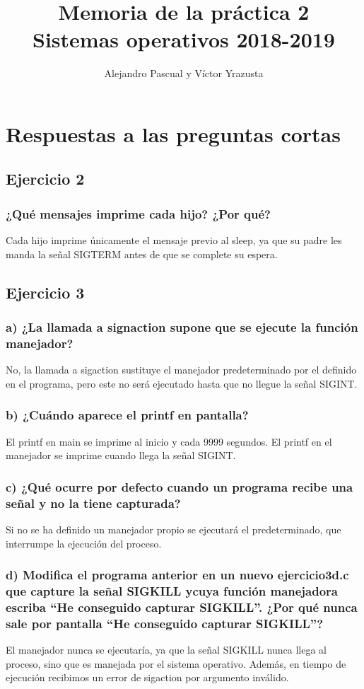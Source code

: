 \documentclass[]{article}
\title{Memoria de la práctica 2\\
	\Large Sistemas operativos 2018-2019}
\author{Alejandro Pascual y V\'ictor Yrazusta}
\begin{document}
\maketitle

\section*{Respuestas a las preguntas cortas}
\subsection*{Ejercicio 2}
\subsubsection*{¿Qué mensajes imprime cada hijo? ¿Por qué?}
Cada hijo imprime únicamente el mensaje previo al sleep, ya que su padre les manda la señal SIGTERM antes de que se complete su espera.

\subsection*{Ejercicio 3}
\subsubsection*{a) ¿La llamada a signaction supone que se ejecute la función manejador?}
No, la llamada a sigaction sustituye el manejador predeterminado por el definido en el programa, pero este no será ejecutado hasta que no llegue la señal SIGINT.

\subsubsection*{b) ¿Cuándo aparece el printf en pantalla?}
El printf en main se imprime al inicio y cada 9999 segundos. El printf en el manejador se imprime cuando llega la señal SIGINT.

\subsubsection*{c) ¿Qué ocurre por defecto cuando un programa recibe una señal y no la tiene capturada?}
Si no se ha definido un manejador propio se ejecutará el predeterminado, que interrumpe la ejecución del proceso.

\subsubsection*{d) Modifica el programa anterior en un nuevo ejercicio3d.c que capture la señal SIGKILL ycuya función manejadora escriba  ``He conseguido capturar SIGKILL''. ¿Por qué nunca sale por pantalla ``He conseguido capturar SIGKILL''?}
El manejador nunca se ejecutaría, ya que la señal SIGKILL nunca llega al proceso, sino que es manejada por el sistema operativo. Además, en tiempo de ejecución recibimos un error de sigaction por argumento inválido.
\end{document}
